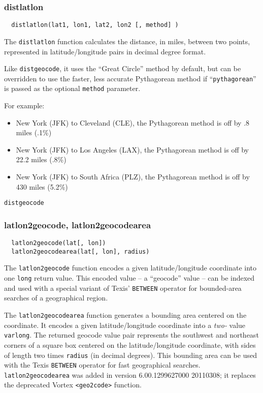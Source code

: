 \subsubsection{distlatlon}

\begin{verbatim}
  distlatlon(lat1, lon1, lat2, lon2 [, method] )
\end{verbatim}

The \verb`distlatlon` function calculates the distance, in miles,
between two points, represented in latitude/longitude pairs in decimal
degree format.

Like \verb`distgeocode`, it uses the ``Great Circle'' method by
default, but can be overridden to use the faster, less accurate
Pythagorean method if ``\verb`pythagorean`'' is passed as the optional
\verb`method` parameter.

For example:
\begin{itemize}
\item New York (JFK) to Cleveland (CLE), the Pythagorean method is off by 
.8 miles (.1\%)
\item New York (JFK) to Los Angeles (LAX), the Pythagorean method is off by 
22.2 miles (.8\%)
\item New York (JFK) to South Africa (PLZ), the Pythagorean method is off by
430 miles (5.2\%)
\end{itemize}

\SEE

\verb`distgeocode`


\subsubsection{latlon2geocode, latlon2geocodearea}

\begin{verbatim}
  latlon2geocode(lat[, lon])
  latlon2geocodearea(lat[, lon], radius)
\end{verbatim}

The \verb`latlon2geocode` function encodes a given latitude/longitude
coordinate into one \verb`long` return value.  This encoded value -- a
``geocode'' value -- can be indexed and used with a special variant of
Texis' \verb`BETWEEN` operator for bounded-area searches of a
geographical region.

The \verb`latlon2geocodearea` function generates a bounding area
centered on the coordinate.  It encodes a given latitude/longitude
coordinate into a {\em two-} value \verb`varlong`.  The returned
geocode value pair represents the southwest and northeast corners of a
square box centered on the latitude/longitude coordinate, with sides
of length two times \verb`radius` (in decimal degrees).  This bounding
area can be used with the Texis \verb`BETWEEN` operator for fast
geographical searches.  \verb`latlon2geocodearea` was added in
version 6.00.1299627000 20110308; it replaces the deprecated Vortex
\verb`<geo2code>` function.

